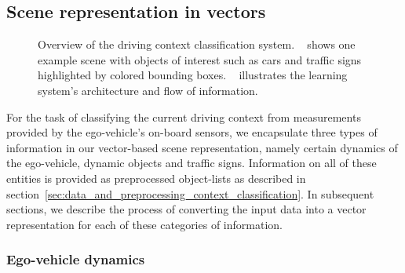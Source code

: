 \subsection{Scene representation in vectors}%
\label{subsec:scene_representation_in_vectors_context_classification}
\begin{figure}[t]
    \centering
    \caption{Overview of the driving context classification system.
    ~\protect{} shows one example scene with objects of interest such as cars and traffic signs highlighted by colored bounding boxes.
~\protect{} illustrates the learning system's architecture and flow of information.}
    \label{fig:context_class_sys_arch}
\end{figure}

For the task of classifying the current driving context from measurements provided by the ego-vehicle's on-board sensors, we encapsulate three types of information in our vector-based scene representation, namely certain dynamics of the ego-vehicle, dynamic objects and traffic signs.
Information on all of these entities is provided as preprocessed object-lists as described in section~\ref{sec:data_and_preprocessing_context_classification}.
In subsequent sections, we describe the process of converting the input data into a vector representation for each of these categories of information.

\subsubsection{Ego-vehicle dynamics}
\label{subsubsec:ego-veh-dyn}

